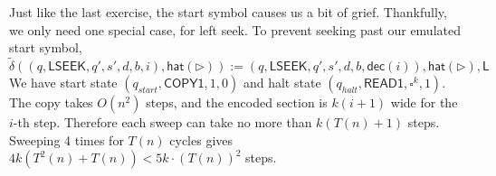 \documentclass[12pt]{article}
\begin{document}
Just like the last exercise, the start symbol causes us a bit of grief. Thankfully, we only need one special case, for left seek. To prevent seeking past our emulated start symbol,
$$
\tilde{\delta}((q, \textsf{LSEEK}, q', s', d, b, i), \textsf{hat}(\triangleright)) := (q, \textsf{LSEEK}, q', s', d, b, \textsf{dec}(i)), \textsf{hat}(\triangleright), \textsf{L}
$$
We have start state $(q_{start}, \textsf{COPY1}, 1, 0)$ and halt state $(q_{halt}, \textsf{READ1}, \square^k, 1)$. The copy takes $O(n^2)$ steps, and the encoded section is $k(i+1)$ wide for the $i$-th step. Therefore each sweep can take no more than $k(T(n) + 1)$ steps. Sweeping 4 times for $T(n)$ cycles gives $4k(T^2(n) + T(n)) < 5k \cdot (T(n))^2$ steps.
\end{document}
